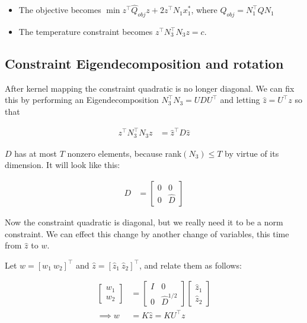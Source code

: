 \documentclass{article}
\begin{document}
\begin{itemize}
\item
  The objective becomes
  $\min z^\top \hat{Q}_{obj} z + 2z^\top N_1x_1^*$, where
  $\hat{Q}_{obj} = N_1^\top Q N_1$
\item
  The temperature constraint becomes $z^\top N_3^\top N_3 z = c$.
\end{itemize}

    \subsection{Constraint Eigendecomposition and
rotation}\label{constraint-eigendecomposition-and-rotation}

After kernel mapping the constraint quadratic is no longer diagonal. We
can fix this by performing an Eigendecomposition
$N_3^\top N_3 = UDU^\top$ and letting $\hat{z} = U^\top z$ so that

\begin{align}
z^\top N_3^\top N_3 z &= \hat{z}^\top D\hat{z}
\end{align}

    $D$ has at most $T$ nonzero elements, because rank$(N _3) \leq T$ by
virtue of its dimension. It will look like this:

\begin{align}
D &= \begin{bmatrix} 0 & 0 \\ 0 & \hat{D} \end{bmatrix}
\end{align}

Now the constraint quadratic is diagonal, but we really need it to be a
norm constraint. We can effect this change by another change of
variables, this time from $\hat{z}$ to $w$.

Let $w = [w_1~w_2]^\top$ and $\hat{z}=[\hat{z}_1~\hat{z}_2]^\top$, and
relate them as follows:

\begin{align}
\begin{bmatrix} w_1 \\ w_2 \end{bmatrix} &=
\begin{bmatrix} I & 0 \\ 0 & \hat{D}^{1/2} \end{bmatrix}
\begin{bmatrix} \hat{z}_1 \\ \hat{z}_2 \end{bmatrix} \\
\implies w &= K\hat{z} = KU^\top z
\end{align}
\end{document}

